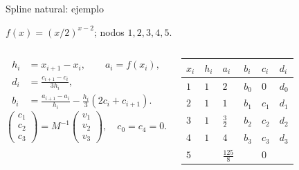 \documentclass[original_version/main.tex]{subfiles}
\begin{document}
\begin{frame}[t]{Spline natural: ejemplo}
\par\noindent\begin{minipage}[t][9mm][t]{\textwidth}\small\strut $f(x)=(x/2)^{x-2}$; nodos $1,2,3,4,5$.\end{minipage}\par\nointerlineskip
\begin{columns}[T]\scriptsize\begin{align*}
h_i&=x_{i+1}-x_i,\qquad a_i=f(x_i),\\
d_i&=\frac{c_{i+1}-c_i}{3h_i},\\
b_i&=\frac{a_{i+1}-a_i}{h_i}-\frac{h_i}{3}(2c_i+c_{i+1}).
\end{align*}\scriptsize\[\begin{pmatrix}c_1\\c_2\\c_3\end{pmatrix}=M^{-1}\begin{pmatrix}v_1\\v_2\\v_3\end{pmatrix},\quad c_0=c_4=0.\]\begin{minipage}[t]{\textwidth}\begingroup\scriptsize\setlength{\tabcolsep}{2pt}\begin{center}\begin{tabular}{|C{.12\textwidth}|C{.12\textwidth}|C{.12\textwidth}|C{.12\textwidth}|C{.12\textwidth}|C{.12\textwidth}|}\hline
\rule[-2mm]{0pt}{6mm}$x_i$&$h_i$&$a_i$&$b_i$&$c_i$&$d_i$\\\hline
\rule[-2.5mm]{0pt}{7mm}$1$&$1$&$2$&$b_0$&$0$&$d_0$\\\hline
\rule[-2.5mm]{0pt}{7mm}$2$&$1$&$1$&$b_1$&$c_1$&$d_1$\\\hline
\rule[-2.5mm]{0pt}{7mm}$3$&$1$&$\frac{3}{2}$&$b_2$&$c_2$&$d_2$\\\hline
\rule[-2.5mm]{0pt}{7mm}$4$&$1$&$4$&$b_3$&$c_3$&$d_3$\\\hline
\rule[-2.5mm]{0pt}{7mm}$5$&&$\frac{125}{8}$&&$0$&\\\hline
\end{tabular}\end{center}\endgroup\end{minipage}\par
\end{columns}
\end{frame}
\end{document}
